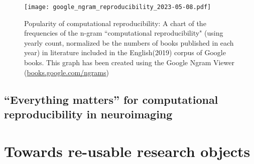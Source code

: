 \begin{figure}
	\centering
	\texttt{[image: google\_ngram\_reproducibility\_2023-05-08.pdf]}
	\caption{Popularity of computational reproducibility: A chart of the frequencies of the n-gram ``computational reproducibility" (using yearly count, normalized be the numbers of books published in each year) in literature included in the English(2019) corpus of Google books. This graph has been created using the Google Ngram Viewer (\href{https://books.google.com/ngrams/info}{books.google.com/ngrams}) \citep{michel2011quantitative}}
	\label{fig:ngram}
\end{figure}


\subsection{``Everything matters'' for computational reproducibility in neuroimaging}



\section{Towards re-usable research objects}

